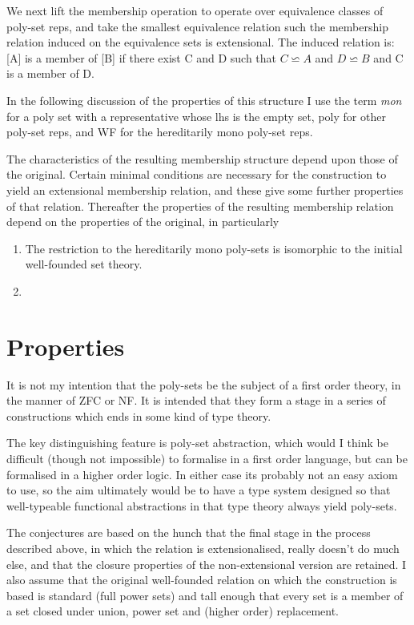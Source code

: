 \documentclass[numreferences]{rbjk}
\begin{document}
\begin{article}
We next lift the membership operation to operate over equivalence classes of poly-set reps, and take the smallest equivalence relation such the membership relation induced on the equivalence sets is extensional.
The induced relation is: [A] is a member of [B] if there exist C and D such that $C \backsimeq A$ and $D \backsimeq B$ and C is a member of D.

In the following discussion of the properties of this structure I use the term {\it mon} for a poly set with a representative whose lhs is the empty set, poly for other poly-set reps, and WF for the hereditarily mono poly-set reps.

The characteristics of the resulting membership structure depend upon those of the original.
Certain minimal conditions are necessary for the construction to yield an extensional membership relation, and these give some further properties of that relation.
Thereafter the properties of the resulting membership relation depend on the properties of the original, in particularly 

\begin{enumerate}
\item The restriction to the hereditarily mono poly-sets is isomorphic to the initial well-founded set theory.
\item 
\end{enumerate}

\section{Properties}

It is not my intention that the poly-sets be the subject of a first order theory, in the manner of ZFC or NF.
It is intended that they form a stage in a series of constructions which ends in some kind of type theory.

The key distinguishing feature is poly-set abstraction, which would I think be difficult (though not impossible) to formalise in a first order language, but can be formalised in a higher order logic.
In either case its probably not an easy axiom to use, so the aim ultimately would be to have a type system designed so that well-typeable functional abstractions in that type theory always yield poly-sets.

The conjectures are based on the hunch that the final stage in the process described above, in which the relation is extensionalised, really doesn't do much else, and that the closure properties of the non-extensional version are retained.
I also assume that the original well-founded relation on which the construction is based is standard (full power sets) and tall enough that every set is a member of a set closed under union, power set and (higher order) replacement.


\end{article}
\end{document}
